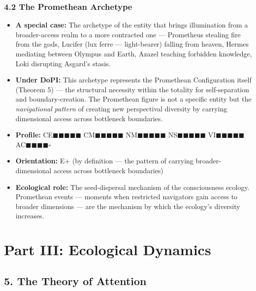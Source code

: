 \subsubsection*{4.2 The Promethean Archetype}

\begin{itemize}[nosep,leftmargin=*]
  \item \textbf{A special case:} The archetype of the entity that brings illumination from a broader-access realm to a more contracted one — Prometheus stealing fire from the gods, Lucifer (lux ferre — light-bearer) falling from heaven, Hermes mediating between Olympus and Earth, Azazel teaching forbidden knowledge, Loki disrupting Asgard's stasis.
  \item \textbf{Under DoPI:} This archetype represents the Promethean Configuration itself (Theorem 5) — the structural necessity within the totality for self-separation and boundary-creation. The Promethean figure is not a specific entity but the \textit{navigational pattern} of creating new perspectival diversity by carrying dimensional access across bottleneck boundaries.
  \item \textbf{Profile:} CE$\blacksquare$$\blacksquare$$\blacksquare$$\blacksquare$$\blacksquare$ CM$\blacksquare$$\blacksquare$$\blacksquare$$\blacksquare$$\blacksquare$ NM$\blacksquare$$\blacksquare$$\blacksquare$$\blacksquare$$\blacksquare$ NS$\blacksquare$$\blacksquare$$\blacksquare$$\blacksquare$$\blacksquare$ VI$\blacksquare$$\blacksquare$$\blacksquare$$\blacksquare$$\blacksquare$ AC$\blacksquare$$\blacksquare$$\blacksquare$$\blacksquare$$\square$
  \item \textbf{Orientation:} E+ (by definition — the pattern of carrying broader-dimensional access across bottleneck boundaries)
  \item \textbf{Ecological role:} The seed-dispersal mechanism of the consciousness ecology. Promethean events — moments when restricted navigators gain access to broader dimensions — are the mechanism by which the ecology's diversity increases.
\end{itemize}


\bigskip\noindent\makebox[\textwidth]{\color{rulegray}\rule{5cm}{0.3pt}}\bigskip


\section*{Part III: Ecological Dynamics}


\subsection*{5. The Theory of Attention}



